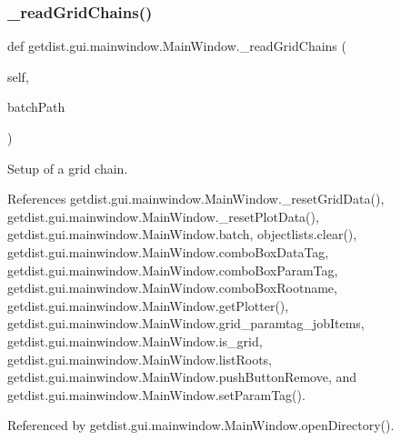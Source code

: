 \subsubsection{\texorpdfstring{\+\_\+read\+Grid\+Chains()}{\_readGridChains()}}
{\footnotesize\ttfamily def getdist.\+gui.\+mainwindow.\+Main\+Window.\+\_\+read\+Grid\+Chains (\begin{DoxyParamCaption}\item[{}]{self,  }\item[{}]{batch\+Path }\end{DoxyParamCaption})\hspace{0.3cm}{\ttfamily [private]}}

\begin{DoxyVerb}Setup of a grid chain.
\end{DoxyVerb}
 

References getdist.\+gui.\+mainwindow.\+Main\+Window.\+\_\+reset\+Grid\+Data(), getdist.\+gui.\+mainwindow.\+Main\+Window.\+\_\+reset\+Plot\+Data(), getdist.\+gui.\+mainwindow.\+Main\+Window.\+batch, objectlists.\+clear(), getdist.\+gui.\+mainwindow.\+Main\+Window.\+combo\+Box\+Data\+Tag, getdist.\+gui.\+mainwindow.\+Main\+Window.\+combo\+Box\+Param\+Tag, getdist.\+gui.\+mainwindow.\+Main\+Window.\+combo\+Box\+Rootname, getdist.\+gui.\+mainwindow.\+Main\+Window.\+get\+Plotter(), getdist.\+gui.\+mainwindow.\+Main\+Window.\+grid\+\_\+paramtag\+\_\+job\+Items, getdist.\+gui.\+mainwindow.\+Main\+Window.\+is\+\_\+grid, getdist.\+gui.\+mainwindow.\+Main\+Window.\+list\+Roots, getdist.\+gui.\+mainwindow.\+Main\+Window.\+push\+Button\+Remove, and getdist.\+gui.\+mainwindow.\+Main\+Window.\+set\+Param\+Tag().



Referenced by getdist.\+gui.\+mainwindow.\+Main\+Window.\+open\+Directory().

